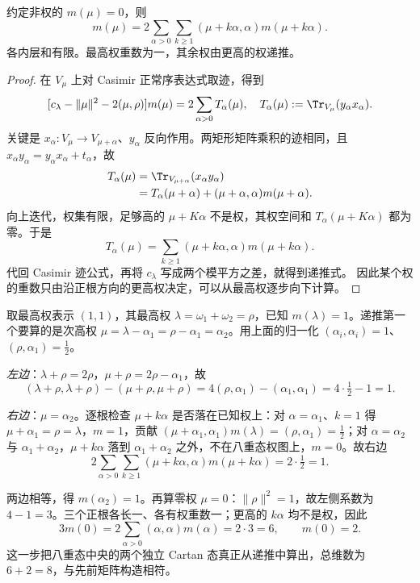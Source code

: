 \begin{theorem}
约定非权的 $m(\mu)=0$，则
\begin{equation}
 [\|\lambda+\rho\|^2-\|\mu+\rho\|^2]m(\mu)
 =2\sum_{\alpha>0}\sum_{k\ge1}(\mu+k\alpha,\alpha)m(\mu+k\alpha).
 \label{eq:freudenthal-recursion}
\end{equation}
各内层和有限。最高权重数为一，其余权由更高的权递推。
\end{theorem}
\begin{proof}
在 $V_\mu$ 上对 Casimir 正常序表达式取迹，得到
\[
 [c_\lambda-\|\mu\|^2-2(\mu,\rho)]m(\mu)
 =2\sum_{\alpha>0}T_\alpha(\mu),\quad
 T_\alpha(\mu):=\Tr_{V_\mu}(y_\alpha x_\alpha).
\]
关键是 $x_\alpha:V_\mu\to V_{\mu+\alpha}$、$y_\alpha$ 反向作用。两矩形矩阵乘积的迹相同，且 $x_\alpha y_\alpha=y_\alpha x_\alpha+t_\alpha$，故
\begin{align*}
 T_\alpha(\mu)
 &=\Tr_{V_{\mu+\alpha}}(x_\alpha y_\alpha)\\
 &=T_\alpha(\mu+\alpha)+(\mu+\alpha,\alpha)m(\mu+\alpha).
\end{align*}
向上迭代，权集有限，足够高的 $\mu+K\alpha$ 不是权，其权空间和 $T_\alpha(\mu+K\alpha)$ 都为零。于是
\[
T_\alpha(\mu)=\sum_{k\ge1}(\mu+k\alpha,\alpha)m(\mu+k\alpha).
\]
代回 Casimir 迹公式，再将 $c_\lambda$ 写成两个模平方之差，就得到递推式。
因此某个权的重数只由沿正根方向的更高权决定，可以从最高权逐步向下计算。
\end{proof}


\begin{example}
取最高权表示 $(1,1)$，其最高权 $\lambda=\omega_1+\omega_2=\rho$，已知 $m(\lambda)=1$。递推第一个要算的是次高权 $\mu=\lambda-\alpha_1=\rho-\alpha_1=\alpha_2$。用上面的归一化 $(\alpha_i,\alpha_i)=1$、$(\rho,\alpha_1)=\tfrac12$。

\emph{左边}：$\lambda+\rho=2\rho$，$\mu+\rho=2\rho-\alpha_1$，故
\[
(\lambda+\rho,\lambda+\rho)-(\mu+\rho,\mu+\rho)
=4(\rho,\alpha_1)-(\alpha_1,\alpha_1)
=4\cdot\tfrac12-1=1.
\]

\emph{右边}：$\mu=\alpha_2$。逐根检查 $\mu+k\alpha$ 是否落在已知权上：对 $\alpha=\alpha_1$、$k=1$ 得 $\mu+\alpha_1=\rho=\lambda$，$m=1$，贡献 $(\mu+\alpha_1,\alpha_1)m(\lambda)=(\rho,\alpha_1)=\tfrac12$；对 $\alpha=\alpha_2$ 与 $\alpha_1+\alpha_2$，$\mu+k\alpha$ 落到 $\alpha_1+\alpha_2$ 之外，不在八重态权图上，$m=0$。故右边
\[
2\sum_{\alpha>0}\sum_{k\ge1}(\mu+k\alpha,\alpha)m(\mu+k\alpha)
=2\cdot\tfrac12=1.
\]

两边相等，得 $m(\alpha_2)=1$。再算零权 $\mu=0$：$\|\rho\|^2=1$，故左侧系数为 $4-1=3$。三个正根各长一、各有权重数一；更高的 $k\alpha$ 均不是权，因此
\[
 3m(0)=2\sum_{\alpha>0}(\alpha,\alpha)m(\alpha)=2\cdot3=6,
 \qquad m(0)=2.
\]
这一步把八重态中央的两个独立 Cartan 态真正从递推中算出，总维数为 $6+2=8$，与先前矩阵构造相符。
\end{example}


